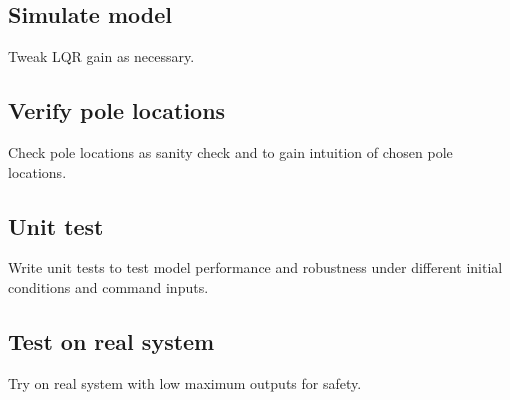 \documentclass[10pt,conference,compsoc]{IEEEtran}
\begin{document}
\subsection{Simulate model}

\noindent Tweak LQR gain as necessary.

\subsection{Verify pole locations}

\noindent Check pole locations as sanity check and to gain intuition of chosen pole locations.

\subsection{Unit test}

\noindent Write unit tests to test model performance and robustness under different initial
conditions and command inputs.


\subsection{Test on real system}

\noindent Try on real system with low maximum outputs for safety.

\appendix


\glsaddall
\printglossaries
\end{document}
